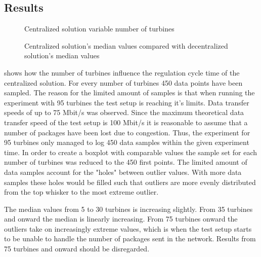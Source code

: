 \subsection{Results}

\begin{figure}[h!]
	\centering
%	
%	
	
	
	\caption{Centralized solution variable number of turbines}
	\label{fig:exp:cen:turbines}
\end{figure}

\begin{figure}[h!]
	\centering
		
	\caption{Centralized solution's median values compared with decentralized solution's median values}
	\label{fig:exp:cenVSDecen}
\end{figure}


 shows how the number of turbines influence the regulation cycle time of the centralized solution.
For every number of turbines 450 data points have been sampled. The reason for the limited amount of samples is that when running the experiment with 95 turbines the test setup is reaching it's limits. Data transfer speeds of up to 75 Mbit/s was observed. Since the maximum theoretical data transfer speed of the test setup is 100 Mbit/s it is reasonable to assume that a number of packages have been lost due to congestion. Thus, the experiment for 95 turbines only managed to log 450 data samples within the given experiment time. In order to create a boxplot with comparable values the sample set for each number of turbines was reduced to the 450 first points.
The limited amount of data samples account for the "holes" between outlier values. With more data samples these holes would be filled such that outliers are more evenly distributed from the top whisker to the most extreme outlier.

The median values from 5 to 30 turbines is increasing slightly. From 35 turbines and onward the median is linearly increasing.
From 75 turbines onward the outliers take on increasingly extreme values, which is when the test setup starts to be unable to handle the number of packages sent in the network. Results from 75 turbines and onward should be disregarded.

